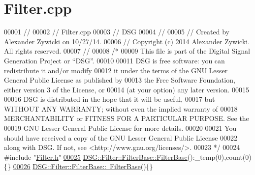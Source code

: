 \hypertarget{_filter_8cpp_source}{\section{Filter.\+cpp}
\label{_filter_8cpp_source}
}

\begin{DoxyCode}
00001 \textcolor{comment}{//}
00002 \textcolor{comment}{//  Filter.cpp}
00003 \textcolor{comment}{//  DSG}
00004 \textcolor{comment}{//}
00005 \textcolor{comment}{//  Created by Alexander Zywicki on 10/27/14.}
00006 \textcolor{comment}{//  Copyright (c) 2014 Alexander Zywicki. All rights reserved.}
00007 \textcolor{comment}{//}
00008 \textcolor{comment}{/*}
00009 \textcolor{comment}{ This file is part of the Digital Signal Generation Project or “DSG”.}
00010 \textcolor{comment}{}
00011 \textcolor{comment}{ DSG is free software: you can redistribute it and/or modify}
00012 \textcolor{comment}{ it under the terms of the GNU Lesser General Public License as published by}
00013 \textcolor{comment}{ the Free Software Foundation, either version 3 of the License, or}
00014 \textcolor{comment}{ (at your option) any later version.}
00015 \textcolor{comment}{}
00016 \textcolor{comment}{ DSG is distributed in the hope that it will be useful,}
00017 \textcolor{comment}{ but WITHOUT ANY WARRANTY; without even the implied warranty of}
00018 \textcolor{comment}{ MERCHANTABILITY or FITNESS FOR A PARTICULAR PURPOSE.  See the}
00019 \textcolor{comment}{ GNU Lesser General Public License for more details.}
00020 \textcolor{comment}{}
00021 \textcolor{comment}{ You should have received a copy of the GNU Lesser General Public License}
00022 \textcolor{comment}{ along with DSG.  If not, see <http://www.gnu.org/licenses/>.}
00023 \textcolor{comment}{ */}
00024 \textcolor{preprocessor}{#include "\hyperlink{_filter_8h}{Filter.h}"}
\hypertarget{_filter_8cpp_source_l00025}{}\hyperlink{class_d_s_g_1_1_filter_1_1_filter_base_accc0a6729e252abaa24ad7f72b2f351d}{00025} \hyperlink{class_d_s_g_1_1_filter_1_1_filter_base_accc0a6729e252abaa24ad7f72b2f351d}{DSG::Filter::FilterBase::FilterBase}():\_temp(0),count(0)\{\}
\hypertarget{_filter_8cpp_source_l00026}{}\hyperlink{class_d_s_g_1_1_filter_1_1_filter_base_a1e220c7fe383eba4822f3896d8b2c2b2}{00026} \hyperlink{class_d_s_g_1_1_filter_1_1_filter_base_a1e220c7fe383eba4822f3896d8b2c2b2}{DSG::Filter::FilterBase::~FilterBase}()\{\}
\end{DoxyCode}
